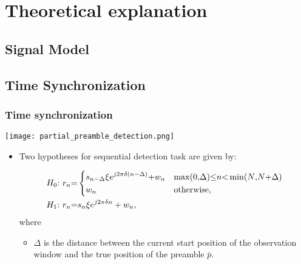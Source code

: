 \section{Theoretical explanation}

\subsection{Signal Model}

\subsection{Time Synchronization}

\begin{frame}
    \frametitle{Time synchronization}

    \begin{center}
      \texttt{[image: partial\_preamble\_detection.png]}
    \end{center}

    \begin{itemize}
      \item Two hypotheses for sequential detection task are given by:
      
      \begin{equation}
        \label{eq:two hypotheses}
        \begin{aligned}
        &H_0{:}~r_n{=}
        \begin{dcases}
            s_{n-\Delta}\xi e^{j2\pi\delta (n-\Delta)}{+}w_n & \max(0{,}\Delta){\leq} n {<} \min(N{,}N{+}\Delta) \\
            w_n & \text{otherwise},
        \end{dcases} \\
        &H_1{:}~r_n{=}s_n\xi e^{j2\pi\delta n}+w_n,
        \end{aligned}
      \end{equation}
      where
      
      \begin{itemize}
          \item $\Delta$ is the distance between the current start position of the observation window and the true position of the preamble $\bar{p}$.
      \end{itemize}

    \end{itemize} 

\end{frame}


